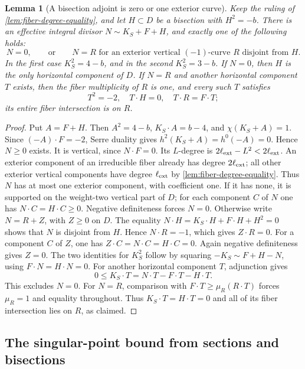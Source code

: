 \documentclass[11pt,reqno]{amsart}
\newtheorem{lemma}[lemma]{Lemma}
\theoremstyle{definition}
\theoremstyle{remark}
\numberwithin{equation}{section}
\begin{document}
\begin{lemma}[A bisection adjoint is zero or one exterior curve]
\label{lem:bisection-adjoint}
Keep the ruling of \cref{lem:fiber-degree-equality}, and let
$H\subset D$ be a bisection with $H^2=-b$.
There is an effective integral divisor $N\sim K_S+F+H$, and exactly
one of the following holds:
\[
 N=0,
 \qquad\text{or}\qquad
 N=R\text{ for an exterior vertical }(-1)\text{-curve }R
       \text{ disjoint from }H.
\]
In the first case $K_S^2=4-b$, and in the second $K_S^2=3-b$.
If $N=0$, then $H$ is the only horizontal component of $D$.
If $N=R$ and another horizontal component $T$ exists, then the fiber
multiplicity of $R$ is one, and every such $T$ satisfies
\[
 T^2=-2,\quad T\cdot H=0,\quad T\cdot R=F\cdot T;
\]
its entire fiber intersection is on $R$.
\end{lemma}

\begin{proof}
Put $A=F+H$. Then $A^2=4-b$, $K_S\cdot A=b-4$, and
$\chi(K_S+A)=1$. Since $(-A)\cdot F=-2$, Serre duality gives
$h^2(K_S+A)=h^0(-A)=0$. Hence $N\ge0$ exists.
It is vertical, since $N\cdot F=0$. Its $L$-degree is
$2\ell_{\rm ext}-L^2<2\ell_{\rm ext}$.
An exterior component of an irreducible fiber already has degree
$2\ell_{\rm ext}$; all other exterior vertical components have degree
$\ell_{\rm ext}$ by \cref{lem:fiber-degree-equality}.
Thus $N$ has at most one exterior component, with coefficient one.
If it has none, it is supported on the weight-two vertical part of $D$;
for each component $C$ of $N$ one has $N\cdot C=H\cdot C\ge0$.
Negative definiteness forces $N=0$.
Otherwise write $N=R+Z$, with $Z\ge0$ on $D$.
The equality $N\cdot H=K_S\cdot H+F\cdot H+H^2=0$ shows that
$N$ is disjoint from $H$. Hence $N\cdot R=-1$, which gives
$Z\cdot R=0$. For a component $C$ of $Z$, one has
$Z\cdot C=N\cdot C=H\cdot C=0$.
Again negative definiteness gives $Z=0$.
The two identities for $K_S^2$ follow by squaring
$-K_S\sim F+H-N$, using $F\cdot N=H\cdot N=0$.
For another horizontal component $T$, adjunction gives
\[
 0\le K_S\cdot T=N\cdot T-F\cdot T-H\cdot T.
\]
This excludes $N=0$. For $N=R$, comparison with
$F\cdot T\ge\mu_R(R\cdot T)$ forces $\mu_R=1$ and equality
throughout. Thus $K_S\cdot T=H\cdot T=0$ and all of its fiber
intersection lies on $R$, as claimed.
\end{proof}

\subsection{The singular-point bound from sections and bisections}
\end{document}
